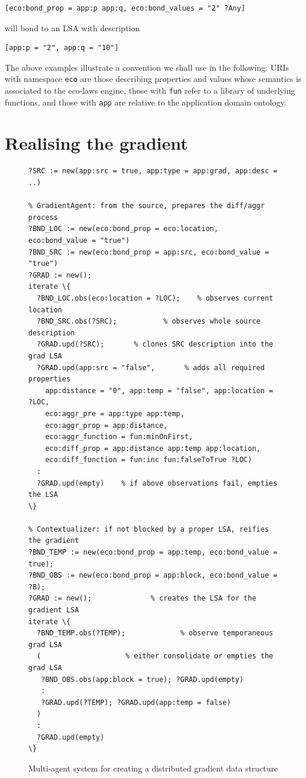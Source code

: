 \documentclass[12pt,a4paper,twoside,openright]{book}
\begin{document}
{\begin{Verbatim}[samepage=true, frame=single]
[eco:bond_prop = app:p app:q, eco:bond_values = "2" ?Any]
\end{Verbatim}
}

will bond to an LSA with description

{\begin{Verbatim}[samepage=true, frame=single]
[app:p = "2", app:q = "10"]
\end{Verbatim}
}

The above examples illustrate a convention we shall use in the following: URIs with namespace \texttt{eco} are those describing properties and values whose semantics is associated to the eco-laws engine, those with \texttt{fun} refer to a library of underlying functions, and those with \texttt{app} are relative to the application domain ontology.


\section{Realising the gradient}\label{s:grad}

\begin{figure}
{\footnotesize \begin{Verbatim}[samepage=true, frame=single, commandchars=\\\{\}]
% Source: injecting the source LSA at a POI
?SRC := new(app:src = true, app:type = app:grad, app:desc = ..)

% GradientAgent: from the source, prepares the diff/aggr process
?BND_LOC := new(eco:bond_prop = eco:location, eco:bond_value = "true")
?BND_SRC := new(eco:bond_prop = app:src, eco:bond_value = "true")
?GRAD := new();
iterate \{
  ?BND_LOC.obs(eco:location = ?LOC);    % observes current location
  ?BND_SRC.obs(?SRC);           % observes whole source description
  ?GRAD.upd(?SRC);       % clones SRC description into the grad LSA
  ?GRAD.upd(app:src = "false",       % adds all required properties
    app:distance = "0", app:temp = "false", app:location = ?LOC,
    eco:aggr_pre = app:type app:temp,
    eco:aggr_prop = app:distance,
    eco:aggr_function = fun:minOnFirst,
    eco:diff_prop = app:distance app:temp app:location,
    eco:diff_function = fun:inc fun:falseToTrue ?LOC)
  :
  ?GRAD.upd(empty)    % if above observations fail, empties the LSA
\}
    
% Contextualizer: if not blocked by a proper LSA, reifies the gradient
?BND_TEMP := new(eco:bond_prop = app:temp, eco:bond_value = true);
?BND_OBS := new(eco:bond_prop = app:block, eco:bond_value = ?B);
?GRAD := new();              % creates the LSA for the gradient LSA
iterate \{
  ?BND_TEMP.obs(?TEMP);             % observe temporaneous grad LSA
  (                    % either consolidate or empties the grad LSA    
   ?BND_OBS.obs(app:block = true); ?GRAD.upd(empty)
   :
   ?GRAD.upd(?TEMP); ?GRAD.upd(app:temp = false)
  )
  :
  ?GRAD.upd(empty) 
\}
\end{Verbatim}
}
\caption{Multi-agent system for creating a distributed gradient data structure}\label{f:grad}
\end{figure}
\end{document}
